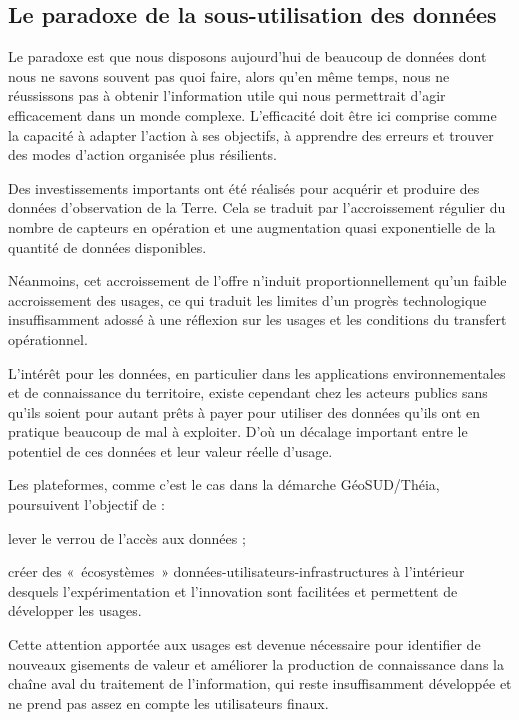 \subsection
{Le paradoxe de la sous-utilisation des données}

Le paradoxe est que nous disposons aujourd'hui de beaucoup de données dont
nous ne savons souvent pas quoi faire, alors qu'en même temps, nous ne
réussissons pas à obtenir l'information utile qui nous permettrait d'agir
efficacement dans un monde complexe. L'efficacité doit être
ici comprise comme la capacité à adapter l'action à ses objectifs, à apprendre
des erreurs et trouver des modes d'action organisée plus résilients.

Des investissements importants ont été réalisés pour acquérir
et produire des données d'observation de la Terre.
Cela se traduit par l'accroissement régulier du
nombre de capteurs en opération et une augmentation quasi exponentielle
de la quantité de données disponibles.

Néanmoins, cet accroissement de l'offre n'induit proportionnellement qu'un
faible accroissement des usages, ce qui traduit les limites d'un progrès
technologique insuffisamment adossé à une réflexion sur les usages et les
conditions du transfert opérationnel.

L'intérêt pour les données, en particulier dans les applications
environnementales et de connaissance du territoire, existe cependant chez les
acteurs publics sans qu'ils soient pour autant prêts à payer pour utiliser des
données qu'ils ont en pratique beaucoup de mal à exploiter. D'où un décalage
important entre le potentiel de ces données et leur valeur réelle d’usage.

Les plateformes, comme c'est le cas dans la démarche GéoSUD/Théia, poursuivent
l'objectif de :

\startitemize

\item lever le verrou de l'accès aux données ;

\item créer des « écosystèmes » données-utilisateurs-infrastructures à l'intérieur
desquels l'expérimentation et l'innovation sont facilitées et permettent de
développer les usages.

\stopitemize

Cette attention apportée aux usages est devenue nécessaire pour identifier de
nouveaux gisements de valeur et améliorer la production de connaissance
dans la chaîne aval du traitement de l'information, qui reste
insuffisamment développée et ne prend pas assez en compte les utilisateurs
finaux.


